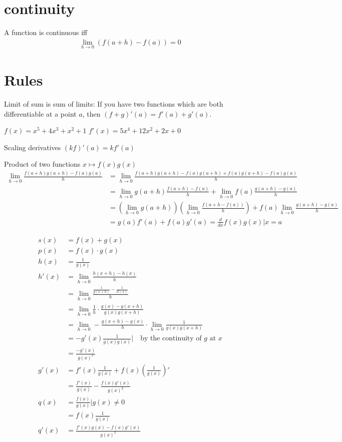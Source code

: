 \section{continuity}
A function is continuous iff
\begin{align}
  \lim_{h \to 0} (f(a+h) - f(a)) =0
\end{align}

\section{Rules}
Limit of sum is sum of limits:
If you have two functions which are both differentiable at a point $a$, then
$(f+g)'(a) = f'(a) + g'(a)$.

$f(x) = x^5 + 4x^3 + x^2 +1$
$f'(x) = 5x^4 + 12x^2 + 2x + 0$


Scaling derivatives
$(kf)'(a) = kf'(a)$


Product of two functions
$x \mapsto f(x)g(x)$
\begin{align}
  \lim_{h \to 0} \frac{f(a+h)g(a+h) - f(a)g(a)}{h}
    &= \lim_{h \to 0} \frac{f(a+h)g(a+h)-f(a)g(a+h) + f(a)g(a+h)-f(a)g(a)}{h} \\
    &= \lim_{h \to 0} g(a+h) \frac{f(a+h)-f(a)}{h} +
       \lim_{h \to 0} f(a) \frac{g(a+h)-g(a)}{h} \\
    &= \left(\lim_{h \to 0} g(a+h)\right)
       \left(\lim_{h \to 0} \frac{f(a+h-f(a))}{h}\right)
       + f(a)\lim_{h \to 0} \frac{g(a+h)-g(a)}{h} \\
    &= g(a)f'(a) + f(a)g'(a) = \frac{d}{dx} f(x)g(x) | x = a
\end{align}


\begin{align}
  s(x) &= f(x) + g(x) \\
  p(x) &= f(x) \cdot g(x) \\
  h(x) &= \frac{1}{g(x)} \\
  h'(x) &= \lim_{h \to 0} \frac{h(x+h)-h(x)}{h} \\
        &= \lim_{h \to 0} \frac{\frac{1}{g(x+h)}-\frac{1}{G(x)}}{h} \\
        &= \lim_{h \to 0} \frac{1}{h} \cdot \frac{g(x)-g(x+h)}{g(x)g(x+h)} \\
        &= \lim_{h \to 0} -\frac{g(x+h)-g(x)}{h} \cdot
          \lim_{h \to 0} \frac{1}{g(x)g(x+h)} \\
        &= -g'(x)\frac{1}{g(x)g(x)} | \quad \text{by the continuity of $g$ at $x$} \\
        &= \frac{-g'(x)}{g(x)^2} \\
        g'(x) &= f'(x)\frac{1}{g(x)} + f(x)(\frac{1}{g(x)})' \\
        &= \frac{f'(x)}{g(x)} - \frac{f(x)g'(x)}{g(x)^2} \\
  q(x) &= \frac{f(x)}{g(x)} | g(x) \neq 0 \\
       &= f(x) \frac{1}{g(x)} \\
  q'(x) &= \frac{f'(x)g(x) - f(x)g'(x)}{g(x)^2} \\
\end{align}

